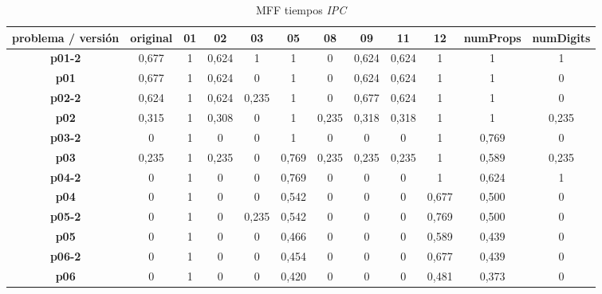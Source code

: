 \documentclass{article}
\begin{document}
    \begin{landscape}
    \begin{table}[]
    \centering
    \caption{MFF tiempos \textit{IPC}}
    \label{my-label}
    \begin{tabular}{|c|c|c|c|c|c|c|c|c|c|c|c|}
    \hline
    \textbf{problema / versión} & \textbf{original} & \textbf{01}    & \textbf{02}    & \textbf{03}    & \textbf{05}    & \textbf{08}  & \textbf{09}    & \textbf{11}    & \textbf{12}    & \textbf{numProps} & \textbf{numDigits} \\ \hline
    \textbf{p01-2}  &  0,677  &  1      &  0,624  &  1      &  1      &  0      &  0,624  &  0,624  &  1      &  1      &  1     \\ \hline
    \textbf{p01}    &  0,677  &  1      &  0,624  &  0      &  1      &  0      &  0,624  &  0,624  &  1      &  1      &  0     \\ \hline
    \textbf{p02-2}  &  0,624  &  1      &  0,624  &  0,235  &  1      &  0      &  0,677  &  0,624  &  1      &  1      &  0     \\ \hline
    \textbf{p02}    &  0,315  &  1      &  0,308  &  0      &  1      &  0,235  &  0,318  &  0,318  &  1      &  1      &  0,235 \\ \hline
    \textbf{p03-2}  &  0      &  1      &  0      &  0      &  1      &  0      &  0      &  0      &  1      &  0,769  &  0     \\ \hline
    \textbf{p03}    &  0,235  &  1      &  0,235  &  0      &  0,769  &  0,235  &  0,235  &  0,235  &  1      &  0,589  &  0,235 \\ \hline
    \textbf{p04-2}  &  0      &  1      &  0      &  0      &  0,769  &  0      &  0      &  0      &  1      &  0,624  &  1     \\ \hline
    \textbf{p04}    &  0      &  1      &  0      &  0      &  0,542  &  0      &  0      &  0      &  0,677  &  0,500  &  0     \\ \hline
    \textbf{p05-2}  &  0      &  1      &  0      &  0,235  &  0,542  &  0      &  0      &  0      &  0,769  &  0,500  &  0     \\ \hline
    \textbf{p05}    &  0      &  1      &  0      &  0      &  0,466  &  0      &  0      &  0      &  0,589  &  0,439  &  0     \\ \hline
    \textbf{p06-2}  &  0      &  1      &  0      &  0      &  0,454  &  0      &  0      &  0      &  0,677  &  0,439  &  0     \\ \hline
    \textbf{p06}    &  0      &  1      &  0      &  0      &  0,420  &  0      &  0      &  0      &  0,481  &  0,373  &  0     \\ \hline

\end{tabular}
\end{table}
\end{landscape}
\end{document}
